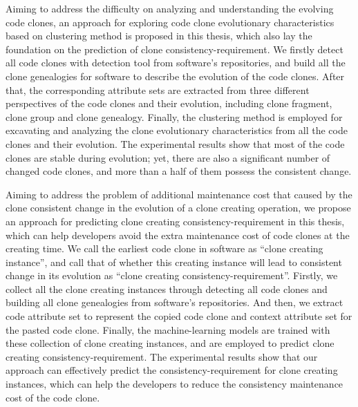 {Aiming to address the difficulty on analyzing and understanding the evolving code clones, an approach for exploring code clone evolutionary characteristics based on clustering method is proposed in this thesis, which also lay the foundation on the prediction of clone consistency-requirement.
We firstly detect all code clones with detection tool from software's repositories, and build all the clone genealogies for software to describe the evolution of the code clones.
After that, the corresponding attribute sets are extracted from three different perspectives of the code clones and their evolution, including clone fragment, clone group and clone genealogy. 
Finally, the clustering method is employed for excavating and analyzing the clone evolutionary characteristics from all the code clones and their evolution. 
The experimental results show that most of the code clones are stable during evolution; yet, there are also a significant number of changed code clones, and more than a half of them possess the consistent change.

Aiming to address the problem of additional maintenance cost that caused by the clone consistent change in the evolution of a clone creating operation, we propose an approach for predicting clone creating consistency-requirement in this thesis, which can help developers avoid the extra maintenance cost of code clones at the creating time.
We call the earliest code clone in software as ``clone creating instance'', and call that of whether this creating instance will lead to consistent change in its evolution as ``clone creating consistency-requirement''.
Firstly, we collect all the clone creating instances through detecting all code clones and building all clone genealogies from software's repositories.
And then, we extract code attribute set to represent the copied code clone and context attribute set for the pasted code clone.
Finally, the machine-learning models are trained with these collection of clone creating instances, and are employed to predict clone creating consistency-requirement. 
The experimental results show that our approach can effectively predict the consistency-requirement for clone creating instances, which can help the developers to reduce the consistency maintenance cost of the code clone.

}
